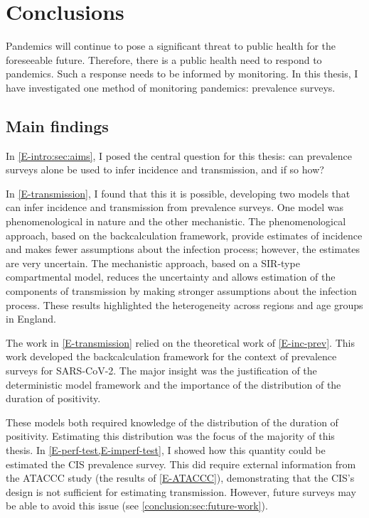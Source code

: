 \documentclass[thesis.tex]{subfiles}
\begin{document}
\ifSubfilesClassLoaded{
    \setcounter{chapter}{7}
}

\chapter{Conclusions} \label{conclusion}

Pandemics will continue to pose a significant threat to public health for the foreseeable future.
Therefore, there is a public health need to respond to pandemics.
Such a response needs to be informed by monitoring.
In this thesis, I have investigated one method of monitoring pandemics: prevalence surveys.

\section{Main findings}

In \cref{E-intro:sec:aims}, I posed the central question for this thesis: can prevalence surveys alone be used to infer incidence and transmission, and if so how?

In \cref{E-transmission}, I found that this it is possible, developing two models that can infer incidence and transmission from prevalence surveys.
One model was phenomenological in nature and the other mechanistic.
The phenomenological approach, based on the backcalculation framework, provide estimates of incidence and makes fewer assumptions about the infection process; however, the estimates are very uncertain.
The mechanistic approach, based on a SIR-type compartmental model, reduces the uncertainty and allows estimation of the components of transmission by making stronger assumptions about the infection process.
These results highlighted the heterogeneity across regions and age groups in England.

The work in \cref{E-transmission} relied on the theoretical work of \cref{E-inc-prev}.
This work developed the backcalculation framework for the context of prevalence surveys for SARS-CoV-2.
The major insight was the justification of the deterministic model framework and the importance of the distribution of the duration of positivity.

These models both required knowledge of the distribution of the duration of positivity.
Estimating this distribution was the focus of the majority of this thesis.
In \cref{E-perf-test,E-imperf-test}, I showed how this quantity could be estimated the CIS prevalence survey.
This did require external information from the ATACCC study (the results of \cref{E-ATACCC}), demonstrating that the CIS's design is not sufficient for estimating transmission.
However, future surveys may be able to avoid this issue (see \cref{conclusion:sec:future-work}).
\end{document}
